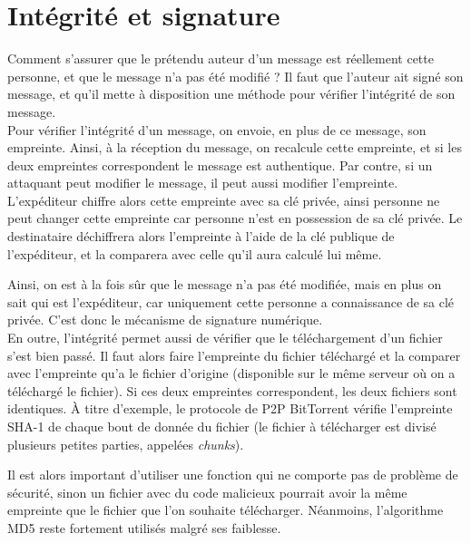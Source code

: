 
\section{Intégrité et signature}
Comment s'assurer que le prétendu auteur d'un message est
réellement cette personne, et que le message n'a pas été modifié ?
Il faut que l'auteur ait signé son message, et qu'il mette à
disposition une méthode pour vérifier l'intégrité de son message.
\\

Pour vérifier l'intégrité d'un message, on envoie, en plus de ce
message, son empreinte. Ainsi, à la réception du
message, on recalcule cette empreinte, et si les deux empreintes
correspondent le message est
authentique. Par contre, si un attaquant peut modifier le message,
il peut aussi modifier l'empreinte. L'expéditeur chiffre
alors cette empreinte avec sa clé privée, ainsi personne ne peut
changer cette empreinte car personne n'est en possession de sa clé
privée. Le destinataire déchiffrera alors l'empreinte à l'aide de
la clé publique de l'expéditeur, et la comparera avec celle qu'il
aura calculé lui même.

Ainsi, on est à la fois sûr que le message n'a pas été modifiée,
mais en plus on sait qui est l'expéditeur, car uniquement cette
personne a connaissance de sa clé privée. C'est donc le mécanisme
de signature numérique.
\\

En outre, l'intégrité permet aussi de vérifier que le
téléchargement d'un fichier s'est bien passé. Il faut alors faire
l'empreinte du fichier téléchargé et la comparer avec l'empreinte
qu'a le fichier d'origine (disponible sur le même serveur où on a
téléchargé le fichier). Si ces deux empreintes correspondent, les
deux fichiers sont identiques. À titre d'exemple, le protocole
de P2P BitTorrent vérifie l'empreinte SHA-1 de chaque bout de donnée
du fichier 
(le fichier à télécharger est divisé plusieurs petites parties, 
appelées \emph{chunks}).  

Il est alors important d'utiliser une fonction qui ne comporte pas
de problème de sécurité, sinon un fichier avec du code malicieux
pourrait avoir la même empreinte que le fichier que l'on souhaite
télécharger. Néanmoins, l'algorithme MD5 reste fortement utilisés
malgré ses faiblesse.

